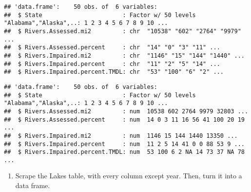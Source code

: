 \documentclass[]{article}
\newenvironment{Shaded}{\begin{snugshade}}{\end{snugshade}}
\newcommand{\KeywordTok}[1]{\textcolor[rgb]{0.13,0.29,0.53}{\textbf{#1}}}
\newcommand{\NormalTok}[1]{#1}
\newcommand{\OperatorTok}[1]{\textcolor[rgb]{0.81,0.36,0.00}{\textbf{#1}}}
\newcommand{\StringTok}[1]{\textcolor[rgb]{0.31,0.60,0.02}{#1}}
\providecommand{\tightlist}{%
  \setlength{\itemsep}{0pt}\setlength{\parskip}{0pt}}
\begin{document}
\begin{verbatim}
## 'data.frame':    50 obs. of  6 variables:
##  $ State                       : Factor w/ 50 levels "Alabama","Alaska",..: 1 2 3 4 5 6 7 8 9 10 ...
##  $ Rivers.Assessed.mi2         : chr  "10538" "602" "2764" "9979" ...
##  $ Rivers.Assessed.percent     : chr  "14" "0" "3" "11" ...
##  $ Rivers.Impaired.mi2         : chr  "1146" "15" "144" "1440" ...
##  $ Rivers.Impaired.percent     : chr  "11" "2" "5" "14" ...
##  $ Rivers.Impaired.percent.TMDL: chr  "53" "100" "6" "2" ...
\end{verbatim}

\begin{Shaded}
\end{Shaded}

\begin{verbatim}
## 'data.frame':    50 obs. of  6 variables:
##  $ State                       : Factor w/ 50 levels "Alabama","Alaska",..: 1 2 3 4 5 6 7 8 9 10 ...
##  $ Rivers.Assessed.mi2         : num  10538 602 2764 9979 32803 ...
##  $ Rivers.Assessed.percent     : num  14 0 3 11 16 56 41 100 20 19 ...
##  $ Rivers.Impaired.mi2         : num  1146 15 144 1440 13350 ...
##  $ Rivers.Impaired.percent     : num  11 2 5 14 41 0 0 88 53 9 ...
##  $ Rivers.Impaired.percent.TMDL: num  53 100 6 2 NA 14 73 37 NA 78 ...
\end{verbatim}

\begin{enumerate}
\def\labelenumi{\arabic{enumi}.}
\setcounter{enumi}{5}
\tightlist
\item
  Scrape the Lakes table, with every column except year. Then, turn it
  into a data frame.
\end{enumerate}
\end{document}
